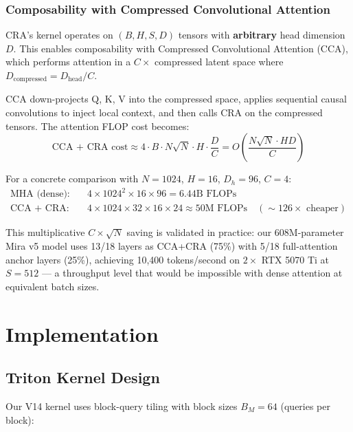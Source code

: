 \documentclass{article}
\begin{document}
    \subsubsection{Composability with Compressed Convolutional Attention}

    CRA's kernel operates on $(B, H, S, D)$ tensors with \textbf{arbitrary} head dimension $D$. This enables composability with Compressed Convolutional Attention (CCA), which performs attention in a $C\times$ compressed latent space where $D_{\text{compressed}} = D_{\text{head}} / C$.

    CCA down-projects Q, K, V into the compressed space, applies sequential causal convolutions to inject local context, and then calls CRA on the compressed tensors. The attention FLOP cost becomes:
    \begin{equation}
    \text{CCA + CRA cost} \approx 4 \cdot B \cdot N\sqrt{N} \cdot H \cdot \frac{D}{C} = O\!\left(\frac{N\sqrt{N} \cdot HD}{C}\right)
    \end{equation}

    For a concrete comparison with $N=1024$, $H=16$, $D_h=96$, $C=4$:
    \begin{align}
    \text{MHA (dense):} \quad & 4 \times 1024^2 \times 16 \times 96 = 6.44\text{B FLOPs} \\
    \text{CCA + CRA:} \quad & 4 \times 1024 \times 32 \times 16 \times 24 \approx 50\text{M FLOPs} \quad (\sim\!126\times \text{ cheaper})
    \end{align}

    This multiplicative $C \times \sqrt{N}$ saving is validated in practice: our 608M-parameter Mira v5 model uses 13/18 layers as CCA+CRA (75\%) with 5/18 full-attention anchor layers (25\%), achieving 10,400 tokens/second on $2\times$ RTX 5070 Ti at $S=512$ --- a throughput level that would be impossible with dense attention at equivalent batch sizes.

    \section{Implementation}
    \label{sec:implementation}

    \subsection{Triton Kernel Design}

    Our V14 kernel uses block-query tiling with block sizes $B_M = 64$ (queries per block):
\end{document}

